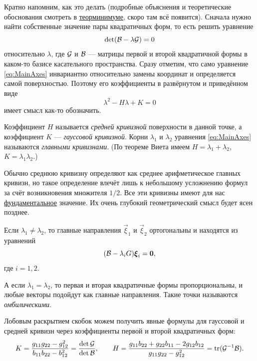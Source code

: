 
Кратно напомним, как это делать (подробные объяснения и теоретические обоснования смотреть в \href{https://github.com/pshenikita/Linal-Teormin}{теорминимуме}, скоро там всё появится). Сначала нужно найти собственные значение пары квадратичных форм, то есть решить уравнение
\begin{equation} \label{eq:MainAxes}
	\det(\mathcal{B} - \lambda\mathcal{G}) = 0
\end{equation}
относительно $\lambda$, где $\mathcal{G}$ и $\mathcal{B}$ --- матрицы первой и второй квадратичной формы в каком-то базисе касательного пространства. Сразу отметим, что само уравнение \eqref{eq:MainAxes} инвариантно относительно замены координат и определяется самой поверхностью. Поэтому его коэффициенты в развёрнутом и приведённом виде
\[
	\lambda^2 -H\lambda + K = 0
\]
имеет смысл как-то обозначить.

\begin{definition}
	Коэффициент $H$ называется \textit{средней кривизной} поверхности в данной точке\footnotemark, а коэффициент $K$ --- \textit{гауссовой кривизной}. Корни $\lambda_1$ и $\lambda_2$ уравнения \eqref{eq:MainAxes} называются \textit{главными кривизнами}. (По теореме Виета имеем $H = \lambda_1 + \lambda_2$, $K = \lambda_1\lambda_2$.)
\end{definition}


Обычно среднюю кривизну определяют как среднее арифметическое главных кривизн, но такое определение влечёт лишь к небольшому усложнению формул за счёт возникновения множителя $1 / 2$. Все эти кривизны имеют для нас \underline{фундаментальное} значение. Их очень глубокий геометрический смысл будет ясен позднее.

Если $\lambda_1 \ne \lambda_2$, то главные направления $\vec{\xi}_1$ и $\vec{\xi}_2$ ортогональны и находятся из уравнений
\[
	(\mathcal{B} - \lambda_iG)\boldsymbol{\xi}_i = \boldsymbol{0},
\]
где $i = 1, 2$.

А если $\lambda_1 = \lambda_2$, то первая и вторая квадратичные формы пропорциональны, и любые векторы подойдут как главные направления. Такие точки называются \textit{омбилическими}.

Лобовым раскрытием скобок можем получить явные формулы для гауссовой и средней кривизн через коэффициенты первой и второй квадратичных форм:
\[
	K = \frac{g_{11}g_{22} - g_{12}^2}{b_{11}b_{22} - b_{12}^2} = \frac{\det\mathcal{G}}{\det\mathcal{B}},\qquad H = \frac{g_{11}b_{22} + g_{22}b_{11} - 2g_{12}b_{12}}{g_{11}g_{22} - g_{12}^2} = \operatorname{tr}(\mathcal{G}^{-1}\mathcal{B}).
\]

